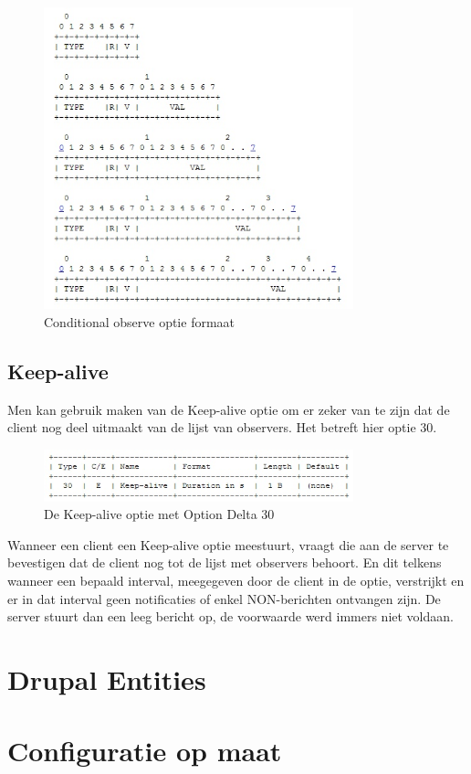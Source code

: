 \begin{figure}[h!]
\centering
\includegraphics[width=0.8\textwidth]{fig/conditional_format}
\caption{Conditional observe optie formaat}
\end{figure}

\subsection{Keep-alive}

Men kan gebruik maken van de Keep-alive optie om er zeker van te zijn dat de client nog deel uitmaakt van de lijst van observers. Het betreft hier optie 30.\\

\begin{figure}[h!]
\centering
\includegraphics[width=0.8\textwidth]{fig/keep_alive}
\caption{De Keep-alive optie met Option Delta 30}
\end{figure}

Wanneer een client een Keep-alive optie meestuurt, vraagt die aan de server te bevestigen dat de client nog tot de lijst met observers behoort. En dit telkens wanneer een bepaald interval,
meegegeven door de client in de optie, verstrijkt en er in dat interval geen notificaties of enkel NON-berichten ontvangen zijn. De server stuurt dan een leeg bericht op, de
voorwaarde werd immers niet voldaan.

\section{Drupal Entities}

\section{Configuratie op maat} \label{configuratie}